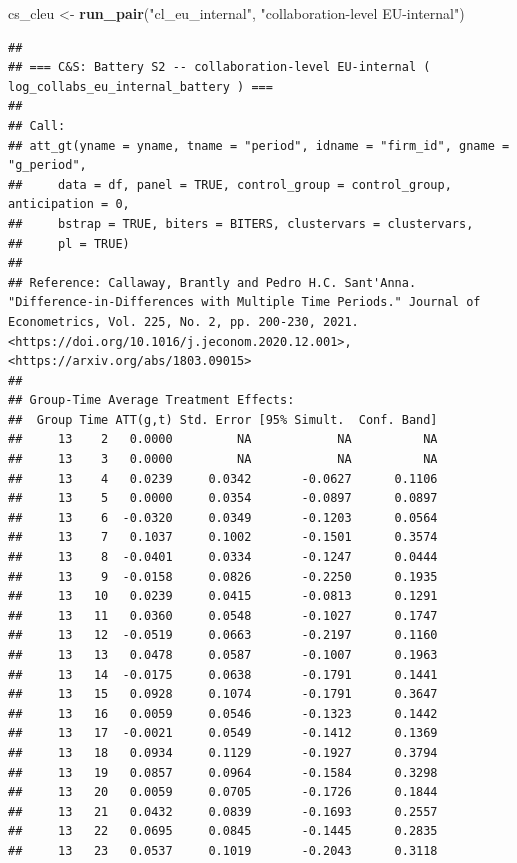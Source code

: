 \documentclass[
]{article}
\newenvironment{Shaded}{\begin{snugshade}}{\end{snugshade}}
\newcommand{\FunctionTok}[1]{\textcolor[rgb]{0.13,0.29,0.53}{\textbf{#1}}}
\newcommand{\NormalTok}[1]{#1}
\newcommand{\OtherTok}[1]{\textcolor[rgb]{0.56,0.35,0.01}{#1}}
\newcommand{\StringTok}[1]{\textcolor[rgb]{0.31,0.60,0.02}{#1}}
\begin{document}
\begin{Shaded}
\begin{Highlighting}[]
\NormalTok{cs\_cleu }\OtherTok{\textless{}{-}} \FunctionTok{run\_pair}\NormalTok{(}\StringTok{"cl\_eu\_internal"}\NormalTok{,   }\StringTok{"collaboration{-}level EU{-}internal"}\NormalTok{)}
\end{Highlighting}
\end{Shaded}

\begin{verbatim}
## 
## === C&S: Battery S2 -- collaboration-level EU-internal ( log_collabs_eu_internal_battery ) ===
## 
## Call:
## att_gt(yname = yname, tname = "period", idname = "firm_id", gname = "g_period", 
##     data = df, panel = TRUE, control_group = control_group, anticipation = 0, 
##     bstrap = TRUE, biters = BITERS, clustervars = clustervars, 
##     pl = TRUE)
## 
## Reference: Callaway, Brantly and Pedro H.C. Sant'Anna.  "Difference-in-Differences with Multiple Time Periods." Journal of Econometrics, Vol. 225, No. 2, pp. 200-230, 2021. <https://doi.org/10.1016/j.jeconom.2020.12.001>, <https://arxiv.org/abs/1803.09015> 
## 
## Group-Time Average Treatment Effects:
##  Group Time ATT(g,t) Std. Error [95% Simult.  Conf. Band] 
##     13    2   0.0000         NA            NA          NA 
##     13    3   0.0000         NA            NA          NA 
##     13    4   0.0239     0.0342       -0.0627      0.1106 
##     13    5   0.0000     0.0354       -0.0897      0.0897 
##     13    6  -0.0320     0.0349       -0.1203      0.0564 
##     13    7   0.1037     0.1002       -0.1501      0.3574 
##     13    8  -0.0401     0.0334       -0.1247      0.0444 
##     13    9  -0.0158     0.0826       -0.2250      0.1935 
##     13   10   0.0239     0.0415       -0.0813      0.1291 
##     13   11   0.0360     0.0548       -0.1027      0.1747 
##     13   12  -0.0519     0.0663       -0.2197      0.1160 
##     13   13   0.0478     0.0587       -0.1007      0.1963 
##     13   14  -0.0175     0.0638       -0.1791      0.1441 
##     13   15   0.0928     0.1074       -0.1791      0.3647 
##     13   16   0.0059     0.0546       -0.1323      0.1442 
##     13   17  -0.0021     0.0549       -0.1412      0.1369 
##     13   18   0.0934     0.1129       -0.1927      0.3794 
##     13   19   0.0857     0.0964       -0.1584      0.3298 
##     13   20   0.0059     0.0705       -0.1726      0.1844 
##     13   21   0.0432     0.0839       -0.1693      0.2557 
##     13   22   0.0695     0.0845       -0.1445      0.2835 
##     13   23   0.0537     0.1019       -0.2043      0.3118 

\end{verbatim}
\end{document}
